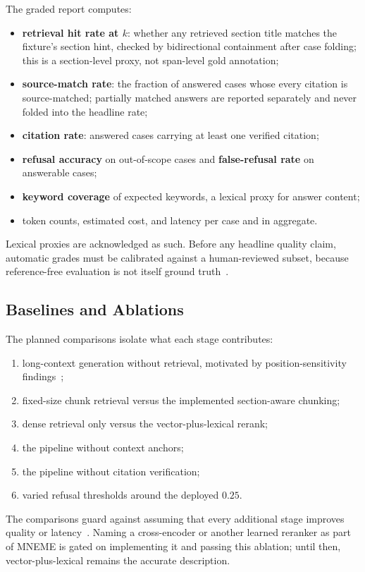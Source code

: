 The graded report computes:
\begin{itemize}
  \item \textbf{retrieval hit rate at \(k\)}: whether any retrieved section title matches the fixture's section hint, checked by bidirectional containment after case folding; this is a section-level proxy, not span-level gold annotation;
  \item \textbf{source-match rate}: the fraction of answered cases whose every citation is source-matched; partially matched answers are reported separately and never folded into the headline rate;
  \item \textbf{citation rate}: answered cases carrying at least one verified citation;
  \item \textbf{refusal accuracy} on out-of-scope cases and \textbf{false-refusal rate} on answerable cases;
  \item \textbf{keyword coverage} of expected keywords, a lexical proxy for answer content;
  \item token counts, estimated cost, and latency per case and in aggregate.
\end{itemize}
Lexical proxies are acknowledged as such.
Before any headline quality claim, automatic grades must be calibrated against a human-reviewed subset, because reference-free evaluation is not itself ground truth~\cite{es2024ragas,saadfalcon2024ares}.

\subsection{Baselines and Ablations}

The planned comparisons isolate what each stage contributes:
\begin{enumerate}
  \item long-context generation without retrieval, motivated by position-sensitivity findings~\cite{liu2024lost};
  \item fixed-size chunk retrieval versus the implemented section-aware chunking;
  \item dense retrieval only versus the vector-plus-lexical rerank;
  \item the pipeline without context anchors;
  \item the pipeline without citation verification;
  \item varied refusal thresholds around the deployed \(0.25\).
\end{enumerate}
The comparisons guard against assuming that every additional stage improves quality or latency~\cite{wang2024bestpractices}.
Naming a cross-encoder or another learned reranker as part of MNEME is gated on implementing it and passing this ablation; until then, vector-plus-lexical remains the accurate description.

